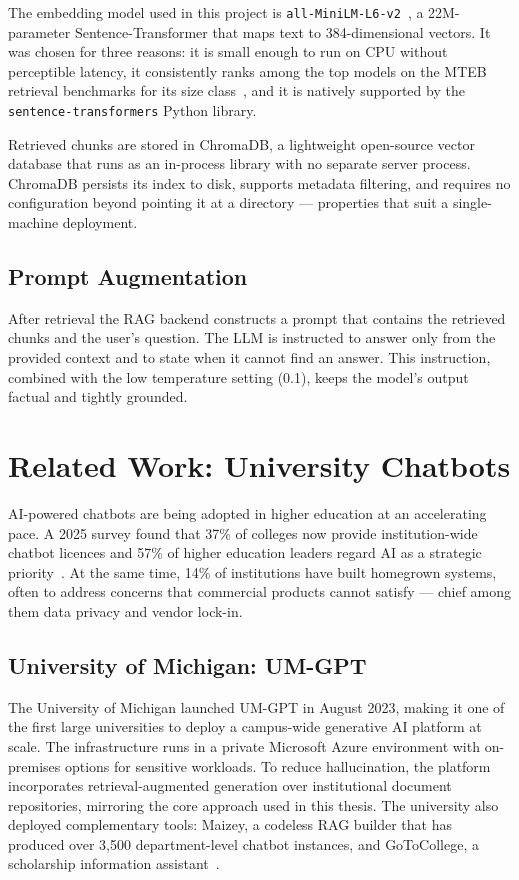 The embedding model used in this project is \texttt{all-MiniLM-L6-v2}~\cite{reimers2019sbert}, a 22M-parameter Sentence-Transformer that maps text to 384-dimensional vectors. It was chosen for three reasons: it is small enough to run on CPU without perceptible latency, it consistently ranks among the top models on the MTEB retrieval benchmarks for its size class~\cite{muennighoff2022mteb}, and it is natively supported by the \texttt{sentence-transformers} Python library.

Retrieved chunks are stored in ChromaDB, a lightweight open-source vector database that runs as an in-process library with no separate server process. ChromaDB persists its index to disk, supports metadata filtering, and requires no configuration beyond pointing it at a directory — properties that suit a single-machine deployment.

\subsection{Prompt Augmentation}

After retrieval the RAG backend constructs a prompt that contains the retrieved chunks and the user's question. The LLM is instructed to answer only from the provided context and to state when it cannot find an answer. This instruction, combined with the low temperature setting (0.1), keeps the model's output factual and tightly grounded.

\section{Related Work: University Chatbots}
\label{sec:bg-related}

AI-powered chatbots are being adopted in higher education at an accelerating pace. A 2025 survey found that 37\% of colleges now provide institution-wide chatbot licences and 57\% of higher education leaders regard AI as a strategic priority~\cite{edtech2025chatbots}. At the same time, 14\% of institutions have built homegrown systems, often to address concerns that commercial products cannot satisfy — chief among them data privacy and vendor lock-in.

\subsection{University of Michigan: UM-GPT}

The University of Michigan launched UM-GPT in August 2023, making it one of the first large universities to deploy a campus-wide generative AI platform at scale. The infrastructure runs in a private Microsoft Azure environment with on-premises options for sensitive workloads. To reduce hallucination, the platform incorporates retrieval-augmented generation over institutional document repositories, mirroring the core approach used in this thesis. The university also deployed complementary tools: Maizey, a codeless RAG builder that has produced over 3{,}500 department-level chatbot instances, and GoToCollege, a scholarship information assistant~\cite{edtech2025chatbots}.


